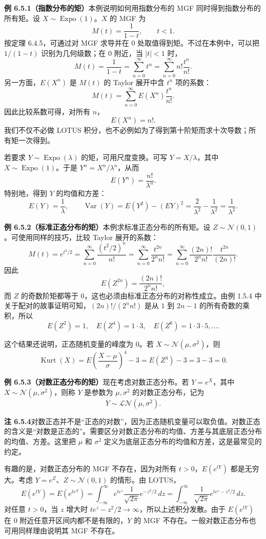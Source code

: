 \documentclass[UTF8, 12pt, fontset=fandol, oneside]{ctexart}
\begin{document}
\noindent\textbf{例 6.5.1（指数分布的矩）}\quad 本例说明如何用指数分布的 MGF 同时得到指数分布的所有矩。设 $X\sim\operatorname{Expo}(1)$。$X$ 的 MGF 为
\[
  M(t)=\frac1{1-t},\qquad t<1.
\]
按定理 6.4.5，可通过对 MGF 求导并在 $0$ 处取值得到矩。不过在本例中，可以把 $1/(1-t)$ 识别为几何级数；在 $0$ 附近，当 $|t|<1$ 时，
\[
  M(t)=\frac1{1-t}
  =
  \sum_{n=0}^{\infty}t^n
  =
  \sum_{n=0}^{\infty}n!\frac{t^n}{n!}.
\]
另一方面，$E(X^n)$ 是 $M(t)$ 的 Taylor 展开中含 $t^n$ 项的系数：
\[
  M(t)=\sum_{n=0}^{\infty}E(X^n)\frac{t^n}{n!}.
\]
因此比较系数可得，对所有 $n$，
\[
  E(X^n)=n!.
\]
我们不仅不必做 LOTUS 积分，也不必例如为了得到第十阶矩而求十次导数；所有矩一次得到。

若要求 $Y\sim\operatorname{Expo}(\lambda)$ 的矩，可用尺度变换。可写 $Y=X/\lambda$，其中 $X\sim\operatorname{Expo}(1)$。于是 $Y^n=X^n/\lambda^n$，从而
\[
  E(Y^n)=\frac{n!}{\lambda^n}.
\]
特别地，得到 $Y$ 的均值和方差：
\[
  E(Y)=\frac1\lambda,\qquad
  \operatorname{Var}(Y)=E(Y^2)-(EY)^2
  =
  \frac2{\lambda^2}-\frac1{\lambda^2}
  =
  \frac1{\lambda^2}.
\]

\noindent\textbf{例 6.5.2（标准正态分布的矩）}\quad 本例求标准正态分布的所有矩。设 $Z\sim\mathcal{N}(0,1)$。可使用同样的技巧，比较 Taylor 展开的系数：
\[
  M(t)=e^{t^2/2}
  =
  \sum_{n=0}^{\infty}\frac{(t^2/2)^n}{n!}
  =
  \sum_{n=0}^{\infty}\frac{t^{2n}}{2^n n!}
  =
  \sum_{n=0}^{\infty}\frac{(2n)!}{2^n n!}\frac{t^{2n}}{(2n)!}.
\]
因此
\[
  E(Z^{2n})=\frac{(2n)!}{2^n n!},
\]
而 $Z$ 的奇数阶矩都等于 $0$，这也必须由标准正态分布的对称性成立。由例 1.5.4 中关于配对的故事证明可知，$(2n)!/(2^n n!)$ 是从 $1$ 到 $2n-1$ 的所有奇数的乘积，所以
\[
  E(Z^2)=1,\quad E(Z^4)=1\cdot3,\quad E(Z^6)=1\cdot3\cdot5,\ldots.
\]

这个结果还说明，正态随机变量的峰度为 $0$。若 $X\sim\mathcal{N}(\mu,\sigma^2)$，则
\[
  \operatorname{Kurt}(X)
  =
  E\left(\frac{X-\mu}{\sigma}\right)^4-3
  =
  E(Z^4)-3=3-3=0.
\]

\noindent\textbf{例 6.5.3（对数正态分布的矩）}\quad 现在考虑对数正态分布。若 $Y=e^X$，其中 $X\sim\mathcal{N}(\mu,\sigma^2)$，则称 $Y$ 是参数为 $\mu,\sigma^2$ 的对数正态分布，记为
\[
  Y\sim\mathcal{LN}(\mu,\sigma^2).
\]

\noindent\textbf{注 6.5.4}\quad 对数正态并不是“正态的对数”，因为正态随机变量可以取负值。对数正态的含义是“对数是正态的”。需要区分对数正态分布的均值、方差与其底层正态分布的均值、方差。这里把 $\mu$ 和 $\sigma^2$ 定义为底层正态分布的均值和方差，这是最常见的约定。

有趣的是，对数正态分布的 MGF 不存在，因为对所有 $t>0$，$E(e^{tY})$ 都是无穷大。考虑 $Y=e^Z$、$Z\sim\mathcal{N}(0,1)$ 的情形。由 LOTUS，
\[
  E(e^{tY})=E(e^{te^Z})
  =
  \int_{-\infty}^{\infty}
  e^{te^z}\frac1{\sqrt{2\pi}}e^{-z^2/2}\,dz
  =
  \int_{-\infty}^{\infty}
  \frac1{\sqrt{2\pi}}e^{te^z-z^2/2}\,dz.
\]
对任意 $t>0$，当 $z$ 增大时 $te^z-z^2/2\to\infty$，所以上述积分发散。由于 $E(e^{tY})$ 在 $0$ 附近任意开区间内都不是有限的，$Y$ 的 MGF 不存在。一般对数正态分布也可用同样理由说明其 MGF 不存在。
\end{document}
